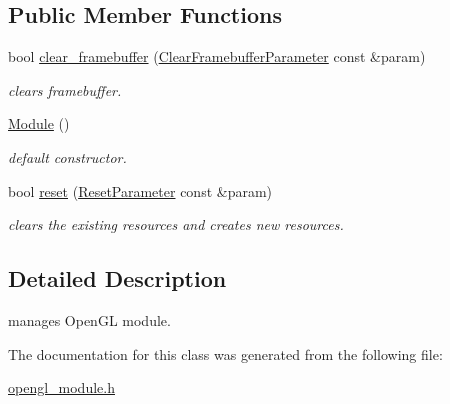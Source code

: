 \subsection*{Public Member Functions}
\begin{DoxyCompactItemize}
\item 
\hypertarget{classhryky_1_1opengl_1_1_module_ae3195bd0969368a580a7b56dedb66f76}{bool \hyperlink{classhryky_1_1opengl_1_1_module_ae3195bd0969368a580a7b56dedb66f76}{clear\-\_\-framebuffer} (\hyperlink{structhryky_1_1opengl_1_1_module_1_1_clear_framebuffer_parameter}{Clear\-Framebuffer\-Parameter} const \&param)}\label{classhryky_1_1opengl_1_1_module_ae3195bd0969368a580a7b56dedb66f76}

\begin{DoxyCompactList}\small\item\em clears framebuffer. \end{DoxyCompactList}\item 
\hypertarget{classhryky_1_1opengl_1_1_module_a905e43365bbc4a79d8e8c3e3df9d70fe}{\hyperlink{classhryky_1_1opengl_1_1_module_a905e43365bbc4a79d8e8c3e3df9d70fe}{Module} ()}\label{classhryky_1_1opengl_1_1_module_a905e43365bbc4a79d8e8c3e3df9d70fe}

\begin{DoxyCompactList}\small\item\em default constructor. \end{DoxyCompactList}\item 
\hypertarget{classhryky_1_1opengl_1_1_module_af09eb5e4e4a6e8f89efdc7b97a220556}{bool \hyperlink{classhryky_1_1opengl_1_1_module_af09eb5e4e4a6e8f89efdc7b97a220556}{reset} (\hyperlink{structhryky_1_1opengl_1_1_module_1_1_reset_parameter}{Reset\-Parameter} const \&param)}\label{classhryky_1_1opengl_1_1_module_af09eb5e4e4a6e8f89efdc7b97a220556}

\begin{DoxyCompactList}\small\item\em clears the existing resources and creates new resources. \end{DoxyCompactList}\end{DoxyCompactItemize}


\subsection{Detailed Description}
manages Open\-G\-L module. 

The documentation for this class was generated from the following file\-:\begin{DoxyCompactItemize}
\item 
\hyperlink{opengl__module_8h}{opengl\-\_\-module.\-h}\end{DoxyCompactItemize}
